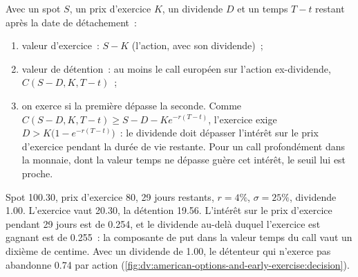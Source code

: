 \begin{method}\label{met:dv:american-options-and-early-exercise:decision}
Avec un spot $S$, un prix d'exercice $K$, un dividende $D$ et un temps $T-t$ restant après la date de détachement~:
\begin{enumerate}
\item valeur d'exercice~: $S-K$ (l'action, avec son dividende)~;
\item valeur de détention~: au moins le call européen sur l'action ex-dividende,
$C(S-D,K,T-t)$~;
\item on exerce si la première dépasse la seconde. Comme $C(S-D,K,T-t)\ge S-D-Ke^{-r(T-t)}$,
l'exercice exige $D>K\bigl(1-e^{-r(T-t)}\bigr)$~: le dividende doit dépasser l'intérêt
sur le prix d'exercice pendant la durée de vie restante. Pour un call profondément dans la monnaie,
dont la valeur temps ne dépasse guère cet intérêt, le seuil lui est proche.
\end{enumerate}
\end{method}

\begin{example}\label{ex:dv:american-options-and-early-exercise:night}
Spot 100.30, prix d'exercice 80, 29 jours restants, $r=4\%$, $\sigma=25\%$, dividende 1.00. L'exercice
vaut 20.30, la détention 19.56. L'intérêt sur le prix d'exercice pendant 29 jours est de 0.254, et le
dividende au-delà duquel l'exercice est gagnant est de 0.255~: la composante de put dans la valeur temps
du call vaut un dixième de centime. Avec un dividende de 1.00, le détenteur qui n'exerce pas abandonne
0.74 par action (\cref{fig:dv:american-options-and-early-exercise:decision}).
\end{example}

